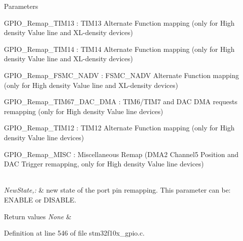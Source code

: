 \begin{DoxyParams}{Parameters}
\begin{DoxyItemize}
G\-P\-I\-O\-\_\-\-Remap\-\_\-\-T\-I\-M13 \-: T\-I\-M13 Alternate Function mapping (only for High density Value line and X\-L-\/density devices) \item G\-P\-I\-O\-\_\-\-Remap\-\_\-\-T\-I\-M14 \-: T\-I\-M14 Alternate Function mapping (only for High density Value line and X\-L-\/density devices) \item G\-P\-I\-O\-\_\-\-Remap\-\_\-\-F\-S\-M\-C\-\_\-\-N\-A\-D\-V \-: F\-S\-M\-C\-\_\-\-N\-A\-D\-V Alternate Function mapping (only for High density Value line and X\-L-\/density devices) \item G\-P\-I\-O\-\_\-\-Remap\-\_\-\-T\-I\-M67\-\_\-\-D\-A\-C\-\_\-\-D\-M\-A \-: T\-I\-M6/\-T\-I\-M7 and D\-A\-C D\-M\-A requests remapping (only for High density Value line devices) \item G\-P\-I\-O\-\_\-\-Remap\-\_\-\-T\-I\-M12 \-: T\-I\-M12 Alternate Function mapping (only for High density Value line devices) \item G\-P\-I\-O\-\_\-\-Remap\-\_\-\-M\-I\-S\-C \-: Miscellaneous Remap (D\-M\-A2 Channel5 Position and D\-A\-C Trigger remapping, only for High density Value line devices) \end{DoxyItemize}
\\
\hline
{\em New\-State,\-:} & new state of the port pin remapping. This parameter can be\-: E\-N\-A\-B\-L\-E or D\-I\-S\-A\-B\-L\-E. \\
\hline
\end{DoxyParams}

\begin{DoxyRetVals}{Return values}
{\em None} & \\
\hline
\end{DoxyRetVals}


Definition at line 546 of file stm32f10x\-\_\-gpio.\-c.

